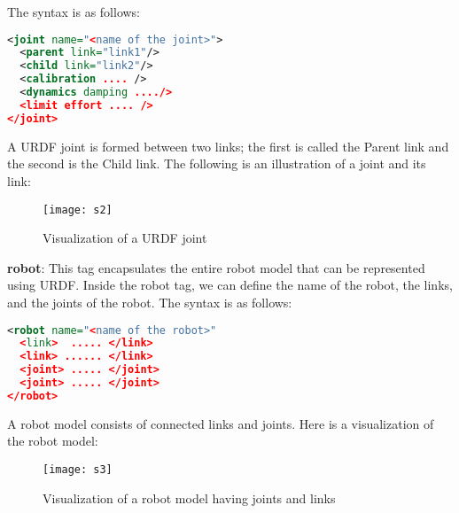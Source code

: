 The syntax is as follows:
\begin{lstlisting}[language=XML]
<joint name="<name of the joint>">
  <parent link="link1"/>
  <child link="link2"/>
  <calibration .... />
  <dynamics damping ..../>
  <limit effort .... />
</joint>
\end{lstlisting}
A URDF joint is formed between two links; the first is called the Parent link and the second is the Child link. The following is an illustration of a joint and its link:\\
\begin{figure}[h]
	\centering
	\texttt{[image: s2]}
	\caption{Visualization of a URDF joint}
	\label{fig:s2}
\end{figure}
\textbf{robot}: This tag encapsulates the entire robot model that can be represented using URDF. Inside the robot tag, we can define the name of the robot, the links, and the joints of the robot.
The syntax is as follows:
\begin{lstlisting}[language=XML]
<robot name="<name of the robot>"
  <link>  ..... </link>
  <link> ...... </link>
  <joint> ..... </joint>
  <joint> ..... </joint>
</robot>
\end{lstlisting}
A robot model consists of connected links and joints. Here is a visualization of the robot model:
\begin{figure}[h]
	\centering
	\texttt{[image: s3]}
	\caption{Visualization of a robot model having joints and links}
	\label{fig:s3}
\end{figure}

